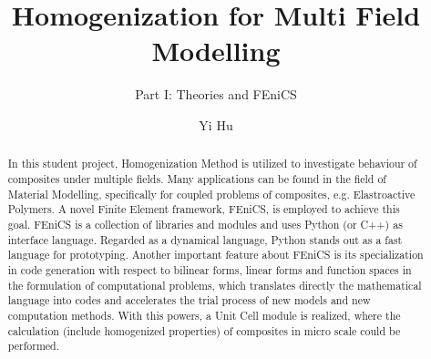 \documentclass[10pt,a4paper]{scrartcl}
\author{Yi Hu}
\title{Homogenization for Multi Field Modelling}
\subtitle{Part I: Theories and FEniCS}
\begin{document}
\begin{abstract}
In this student project, Homogenization Method is utilized to investigate behaviour of composites under multiple fields. Many applications can be found in the field of Material Modelling, specifically for coupled problems of composites, e.g. Elastroactive Polymers. A novel Finite Element framework, FEniCS, is employed to achieve this goal. FEniCS is a collection of libraries and modules and uses Python (or C++) as interface language. Regarded as a dynamical language, Python stands out as a fast language for prototyping. Another important feature about FEniCS is its specialization in code generation with respect to bilinear forms, linear forms and function spaces in the formulation of computational problems, which translates directly the mathematical language into codes and accelerates the trial process of new models and new computation methods. With this powers, a Unit Cell module is realized, where the calculation (include homogenized properties) of composites in micro scale could be performed.

\end{abstract}
\end{document}
